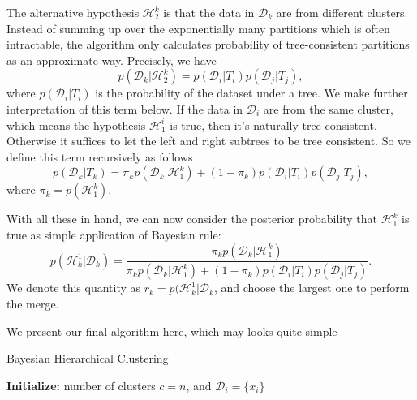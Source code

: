 The alternative hypothesis $\mathcal{H}_2^k$ is that the data in $\mathcal{D}_k$ are from different clusters. Instead of summing up over the exponentially many partitions which is often intractable, the algorithm only calculates probability of tree-consistent partitions as an approximate way. Precisely, we have
\begin{equation*}
    p(\mathcal{D}_k|\mathcal{H}_2^k)= p(\mathcal{D}_i|T_i)p(\mathcal{D}_j|T_j),
\end{equation*}
where $p(\mathcal{D}_i| T_i)$ is the probability of the dataset under a tree. We make further interpretation of this term below. If the data in $\mathcal{D}_i$ are from the same cluster, which means the hypothesis $\mathcal{H}_1^i$ is true, then it's naturally tree-consistent. Otherwise it suffices to let the left and right subtrees to be tree consistent. So we define this term recursively as follows
\begin{equation*}
    p(\mathcal{D}_k|T_k)=\pi_k p(\mathcal{D}_k|\mathcal{H}_1^k) +(1-\pi_k)p(\mathcal{D}_i|T_i)p(\mathcal{D}_j|T_j),
\end{equation*}
where $\pi_k=p(\mathcal{H}_1^k)$.

With all these in hand, we can now consider the posterior probability that $\mathcal{H}_1^k$ is true as simple application of Bayesian rule:
\begin{equation*}
    p(\mathcal{H}_k^1 |\mathcal{D}_k) = \frac{\pi_k p(\mathcal{D}_k|\mathcal{H}_1^k)}{\pi_k p(\mathcal{D}_k|\mathcal{H}_1^k)+(1-\pi_k) p(\mathcal{D}_i|T_i)p(\mathcal{D}_j|T_j)}.
\end{equation*}
We denote this quantity as $r_k=p(\mathcal{H}_k^1| \mathcal{D}_k$, and choose the largest one to perform the merge.

We present our final algorithm here, which may looks quite simple

\begin{algorithm}
    \caption{Bayesian Hierarchical Clustering}
    \textbf{Initialize:} number of clusters $c=n$, and $\mathcal{D}_i=\{x_i\}$\;
\end{algorithm}

